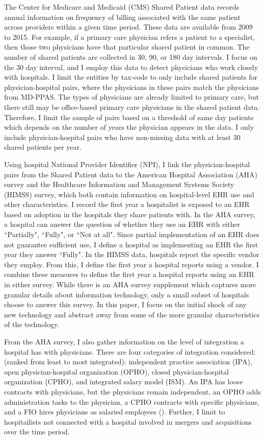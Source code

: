 \documentclass[12pt]{article}
\begin{document}
The Center for Medicare and Medicaid (CMS) Shared Patient data records annual information on frequency of billing associated with the same patient across providers within a given time period. These data are available from 2009 to 2015. For example, if a primary care physician refers a patient to a specialist, then those two physicians have that particular shared patient in common. The number of shared patients are collected in 30, 90, or 180 day intervals. I focus on the 30 day interval, and I employ this data to detect physicians who work closely with hospitals. I limit the entities by tax-code to only include shared patients for physician-hospital pairs, where the physicians in these pairs match the physicians from MD-PPAS. The types of physicians are already limited to primary care, but there still may be office-based primary care physicians in the shared patient data. Therefore, I limit the sample of pairs based on a threshold of same day patients which depends on the number of years the physician appears in the data. I only include physician-hospital pairs who have non-missing data with at least 30 shared patients per year.


Using hospital National Provider Identifier (NPI), I link the physician-hospital pairs from the Shared Patient data to the American Hospital Association (AHA) survey and the Healthcare Information and Management Systems Society (HIMSS) survey, which both contain information on hospital-level EHR use and other characteristics. I record the first year a hospitalist is exposed to an EHR based on adoption in the hospitals they share patients with. In the AHA survey, a hospital can answer the question of whether they use an EHR with either ``Partially", ``Fully", or ``Not at all". Since partial implementation of an EHR does not guarantee sufficient use, I define a hospital as implementing an EHR the first year they answer ``Fully". In the HIMSS data, hospitals report the specific vendor they employ. From this, I define the first year a hospital reports using a vendor. I combine these measures to define the first year a hospital reports using an EHR in either survey. While there is an AHA survey supplement which captures more granular details about information technology, only a small subset of hospitals choose to answer this survey. In this paper, I focus on the initial shock of any new technology and abstract away from some of the more granular characteristics of the technology.

From the AHA survey, I also gather information on the level of integration a hospital has with physicians. There are four categories of integration considered: (ranked from least to most integrated): independent practice association (IPA), open physician-hospital organization (OPHO), closed physician-hospital organization (CPHO), and integrated salary model (ISM). An IPA has loose contracts with physicians, but the physicians remain independent, an OPHO adds administration tasks to the physician, a CPHO contracts with specific physicians, and a FIO hires physicians as salaried employees (\cite{short2017integration}). Further, I limit to hospitailists not connected with a hospital involved in mergers and acquisitions over the time period.
\end{document}
